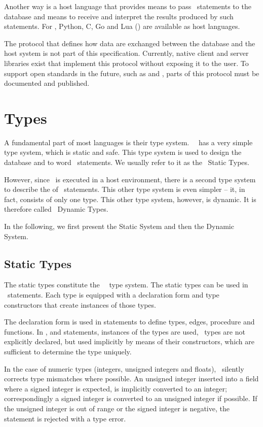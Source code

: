 Another way is a host language
that provides means to pass \sql\ statements
to the database and means to receive
and interpret the results produced by such statements.
For \nowdb, Python, C, Go and Lua ()
are available as host languages.

The protocol that defines how data are exchanged
between the database and the host system
is not part of this specification.
Currently, native client and server libraries
exist that implement this protocol
without exposing it to the user.
To support open standards in the future, such as
 and ,
parts of this protocol must be documented
and published.

\section{Types}
A fundamental part of most languages
is their type system. \nowdb\ \sql\
has a very simple type system,
which is static and safe.
This type system is used to design
the database and to word
\sql\ statements.
We usually refer to it as the \sql\ Static Types.

However, since \sql\ is executed
in a host environment, there is a second
type system to describe the 
of \sql\ statements.
This other type system is even simpler --
it, in fact, consists of only one type.
This other type system, however, is dynamic.
It is therefore called \sql\ Dynamic Types.

In the following, we first present
the Static System and then the Dynamic System.

\subsection{Static Types}
The static types constitute the \nowdb\ \sql\ type system.
The static types can be used in \sql\ statements.
Each type is equipped with a declaration form and
type constructors that create instances of those types.

The declaration form is used in  statements
to define types, edges, procedure and functions.
In ,  and  statements,
instances of the types are used, \ie\
types are not explicitly declared, but used implicitly
by means of their constructors, which are sufficient
to determine the type uniquely.

In the case of numeric types
(integers, unsigned integers and floats),
\nowdb\ silently corrects type mismatches where possible.
An unsigned integer inserted into a field where
a signed integer is expected, is implicitly converted
to an integer; correspondingly a signed integer
is converted to an unsigned integer if possible.
If the unsigned integer is out of range or
the signed integer is negative, the statement
is rejected with a type error.

